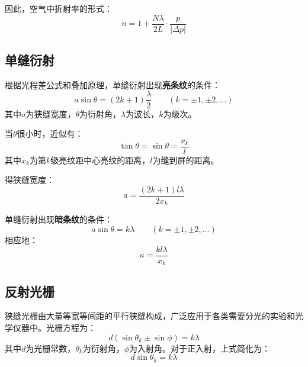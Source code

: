 \documentclass[UTF8]{article}
\begin{document}
因此，空气中折射率的形式：
\begin{equation}
    n = 1 + \frac{N\lambda}{2L} \cdot \frac{p}{|\Delta p|}
    \label{eq:air-n}
\end{equation}

\subsection{单缝衍射}

根据光程差公式和叠加原理，单缝衍射出现\textbf{亮条纹}的条件：
\begin{equation}
    a\sin\theta = (2k+1)\frac{\lambda}{2} \qquad (k = \pm 1, \pm 2, \ldots)
    \label{eq:bright-fringe}
\end{equation}
其中$a$为狭缝宽度，$\theta$为衍射角，$\lambda$为波长，$k$为级次。

当$\theta$很小时，近似有：
\begin{equation}
    \tan\theta = \sin\theta = \frac{x_k}{l}
    \label{eq:small-angle}
\end{equation}
其中$x_k$为第$k$级亮纹距中心亮纹的距离，$l$为缝到屏的距离。

得狭缝宽度：
\begin{equation}
    a = \frac{(2k+1) l \lambda}{2 x_k}
    \label{eq:slit-width}
\end{equation}

单缝衍射出现\textbf{暗条纹}的条件：
\begin{equation}
    a\sin\theta = k\lambda \qquad (k = \pm 1, \pm 2, \ldots)
    \label{eq:dark-fringe}
\end{equation}
相应地：
\begin{equation}
    a = \frac{k l \lambda}{x_k}
    \label{eq:slit-width-dark}
\end{equation}

\subsection{反射光栅}

狭缝光栅由大量等宽等间距的平行狭缝构成，广泛应用于各类需要分光的实验和光学仪器中。光栅方程为：
\begin{equation}
    d(\sin\theta_k \pm \sin\phi) = k\lambda
    \label{eq:grating-general}
\end{equation}
其中$d$为光栅常数，$\theta_k$为衍射角，$\phi$为入射角。对于正入射，上式简化为：
\begin{equation}
    d\sin\theta_k = k\lambda
    \label{eq:grating-normal}
\end{equation}
\end{document}

